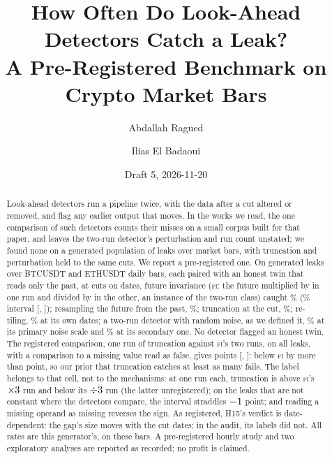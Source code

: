 \documentclass[11pt]{article}
\title{How Often Do Look-Ahead Detectors Catch a Leak?\\ A Pre-Registered Benchmark on Crypto Market Bars}
\author{Abdallah Ragued \and Ilias El Badaoui}
\date{Draft 5, 2026-11-20}
\DeclareRobustCommand{\todo}[1]{\textcolor{red}{\textbf{[TODO: #1]}}}
\newcommand{\FI}{\textsc{fi}}
\newcommand{\pct}{\%}
\begin{document}
\maketitle

\begin{abstract}
Look-ahead detectors run a pipeline twice, with the data after a cut altered or removed, and flag
any earlier output that moves. In the works we read, the one comparison of such detectors counts
their misses on a small corpus built for that paper, and leaves the two-run detector's perturbation
and run count unstated; we found none on a generated population of leaks over market bars, with
truncation and perturbation held to the same cuts. We report a pre-registered one. On \NumPopN{} generated leaks over BTCUSDT and
ETHUSDT daily bars, each paired with an honest twin that reads only the past, at \NumHoneCutsN{}
cuts on \NumCutDates{} dates, future invariance (\FI: the future multiplied by \NumFIup{} in one
run and divided by \NumFIdown{} in the other, an instance of the two-run class) caught
\NumCFiAll\pct{} (\NumConf\pct{} interval [\NumCFiAllLo, \NumCFiAllHi]); resampling the future from the past,
\NumCShAll\pct; truncation at the cut, \NumCTzGAll\pct; re-tiling, \NumCRtGAll\pct{} at its own
dates; a two-run detector with random noise, as we defined it, \NumCTrAll\pct{} at its primary noise scale
and \NumCTrHiAll\pct{} at its secondary one. No detector flagged an honest twin.
The registered comparison, one run of truncation against \FI's two runs, on all leaks, with a
comparison to a missing value read as false, gives \NumCHDiff{} points [\NumCHLo,
\NumCHHi]: below \FI{} by more than \NumHfifteenMargin{} point, so our prior that truncation
catches at least as many fails. The label belongs to that cell, not to the mechanisms: at one run
each, truncation is above \FI's $\times3$ run and below its $\div3$ run (the
latter unregistered); on the leaks that are not constant where the
detectors compare, the interval straddles $-1$ point; and reading a missing
operand as missing reverses the sign. As registered, H15's verdict is date-dependent: the gap's size
moves with the cut dates; in the audit, its labels did not. All rates are this generator's, on
these bars. A pre-registered hourly study and two exploratory analyses are reported as recorded;
no profit is claimed.
\end{abstract}

\end{document}
